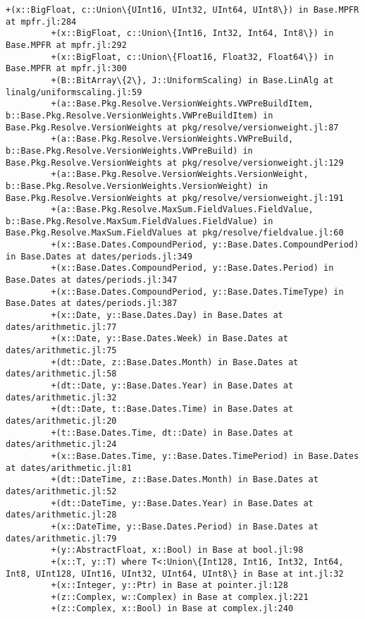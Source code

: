 \documentclass[11pt]{article}
\begin{document}
\begin{Verbatim}[commandchars=\\\{\}]
         +(x::BigFloat, c::Union\{UInt16, UInt32, UInt64, UInt8\}) in Base.MPFR at mpfr.jl:284
         +(x::BigFloat, c::Union\{Int16, Int32, Int64, Int8\}) in Base.MPFR at mpfr.jl:292
         +(x::BigFloat, c::Union\{Float16, Float32, Float64\}) in Base.MPFR at mpfr.jl:300
         +(B::BitArray\{2\}, J::UniformScaling) in Base.LinAlg at linalg/uniformscaling.jl:59
         +(a::Base.Pkg.Resolve.VersionWeights.VWPreBuildItem, b::Base.Pkg.Resolve.VersionWeights.VWPreBuildItem) in Base.Pkg.Resolve.VersionWeights at pkg/resolve/versionweight.jl:87
         +(a::Base.Pkg.Resolve.VersionWeights.VWPreBuild, b::Base.Pkg.Resolve.VersionWeights.VWPreBuild) in Base.Pkg.Resolve.VersionWeights at pkg/resolve/versionweight.jl:129
         +(a::Base.Pkg.Resolve.VersionWeights.VersionWeight, b::Base.Pkg.Resolve.VersionWeights.VersionWeight) in Base.Pkg.Resolve.VersionWeights at pkg/resolve/versionweight.jl:191
         +(a::Base.Pkg.Resolve.MaxSum.FieldValues.FieldValue, b::Base.Pkg.Resolve.MaxSum.FieldValues.FieldValue) in Base.Pkg.Resolve.MaxSum.FieldValues at pkg/resolve/fieldvalue.jl:60
         +(x::Base.Dates.CompoundPeriod, y::Base.Dates.CompoundPeriod) in Base.Dates at dates/periods.jl:349
         +(x::Base.Dates.CompoundPeriod, y::Base.Dates.Period) in Base.Dates at dates/periods.jl:347
         +(x::Base.Dates.CompoundPeriod, y::Base.Dates.TimeType) in Base.Dates at dates/periods.jl:387
         +(x::Date, y::Base.Dates.Day) in Base.Dates at dates/arithmetic.jl:77
         +(x::Date, y::Base.Dates.Week) in Base.Dates at dates/arithmetic.jl:75
         +(dt::Date, z::Base.Dates.Month) in Base.Dates at dates/arithmetic.jl:58
         +(dt::Date, y::Base.Dates.Year) in Base.Dates at dates/arithmetic.jl:32
         +(dt::Date, t::Base.Dates.Time) in Base.Dates at dates/arithmetic.jl:20
         +(t::Base.Dates.Time, dt::Date) in Base.Dates at dates/arithmetic.jl:24
         +(x::Base.Dates.Time, y::Base.Dates.TimePeriod) in Base.Dates at dates/arithmetic.jl:81
         +(dt::DateTime, z::Base.Dates.Month) in Base.Dates at dates/arithmetic.jl:52
         +(dt::DateTime, y::Base.Dates.Year) in Base.Dates at dates/arithmetic.jl:28
         +(x::DateTime, y::Base.Dates.Period) in Base.Dates at dates/arithmetic.jl:79
         +(y::AbstractFloat, x::Bool) in Base at bool.jl:98
         +(x::T, y::T) where T<:Union\{Int128, Int16, Int32, Int64, Int8, UInt128, UInt16, UInt32, UInt64, UInt8\} in Base at int.jl:32
         +(x::Integer, y::Ptr) in Base at pointer.jl:128
         +(z::Complex, w::Complex) in Base at complex.jl:221
         +(z::Complex, x::Bool) in Base at complex.jl:240

\end{Verbatim}
\end{document}
